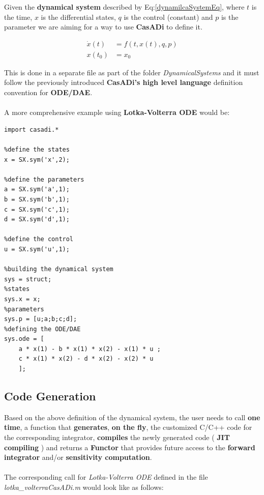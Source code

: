 \documentclass[12pt, letterpaper]{article}
\begin{document}
Given the \textbf{dynamical system} described by Eq:\ref{dynamilcaSystemEq}, where $t$ is the time, $x$ is the differential states, $q$ is the control (constant) and $p$ is the parameter we  are aiming for a way to use \textbf{CasADi} to define it.

\begin{subequations}
\label{dynamilcaSystemEq}
\begin{align}
\dot{x}(t) &= f(t, x(t), q, p)   \\
x(t_0) &=x_0
\end{align}
\end{subequations}

This is done in a separate file as part of the folder  \textit{DynamicalSystems} and it must follow the previously introduced \textbf{CasADi's high level language} definition convention for \textbf{ODE/DAE}. 
\\
\\
A more comprehensive example using \textbf{Lotka-Volterra ODE} would be:

\begin{lstlisting}
import casadi.*

%define the states
x = SX.sym('x',2);

%define the parameters
a = SX.sym('a',1);
b = SX.sym('b',1);
c = SX.sym('c',1);
d = SX.sym('d',1);

%define the control
u = SX.sym('u',1);

%building the dynamical system
sys = struct;
%states
sys.x = x;
%parameters
sys.p = [u;a;b;c;d];
%defining the ODE/DAE
sys.ode = [ 
    a * x(1) - b * x(1) * x(2) - x(1) * u ; 
    c * x(1) * x(2) - d * x(2) - x(2) * u 
    ];
\end{lstlisting}

\subsection{Code Generation}
\label{label_code_generation}

Based on the above definition of the dynamical system, the user needs to call \textbf{one time}, a function that \textbf{generates}, \textbf{on the fly}, the customized C/C++ code for the corresponding integrator, \textbf{compiles} the newly generated code ( \textbf{JIT compiling} ) and returns a \textbf{Functor} that provides future access to the \textbf{forward integrator} and/or \textbf{sensitivity computation}.
\\
\\
The corresponding call for \textit{Lotka-Volterra ODE} defined in the file \\ \textit{lotka\_volterraCasADi.m} would look like as follows:
\end{document}
